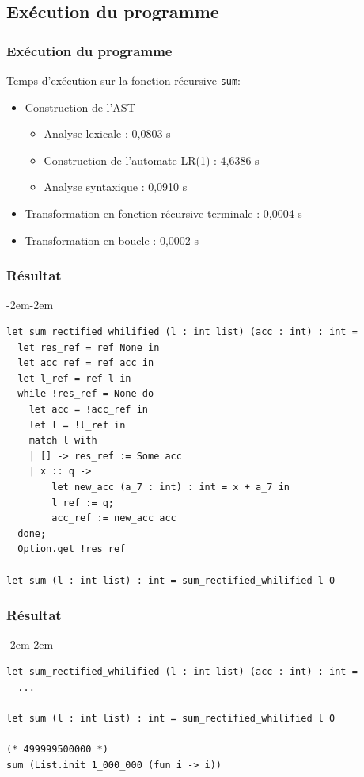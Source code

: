 \subsection{Exécution du programme}
\addtocounter{framenumber}{-1}
\begin{frame}
    \frametitle{Exécution du programme}

    Temps d'exécution sur la fonction récursive \texttt{sum}:
    \begin{itemize}
        \item Construction de l'AST
              \begin{itemize}
                  \item Analyse lexicale : 0,0803 s
                  \item Construction de l'automate LR(1) : 4,6386 s
                  \item Analyse syntaxique : 0,0910 s
              \end{itemize}
        \item Transformation en fonction récursive terminale : 0,0004 s
        \item Transformation en boucle : 0,0002 s
    \end{itemize}
\end{frame}

\begin{frame}[fragile,t]
    \frametitle{Résultat}

    \begin{adjustwidth}{-2em}{-2em}
        \small \begin{verbatim}
let sum_rectified_whilified (l : int list) (acc : int) : int =
  let res_ref = ref None in
  let acc_ref = ref acc in
  let l_ref = ref l in
  while !res_ref = None do
    let acc = !acc_ref in
    let l = !l_ref in
    match l with
    | [] -> res_ref := Some acc
    | x :: q ->
        let new_acc (a_7 : int) : int = x + a_7 in
        l_ref := q;
        acc_ref := new_acc acc
  done;
  Option.get !res_ref

let sum (l : int list) : int = sum_rectified_whilified l 0
        \end{verbatim}

    \end{adjustwidth}
\end{frame}

\addtocounter{framenumber}{-1}
\begin{frame}[fragile,t]
    \frametitle{Résultat}

    \begin{adjustwidth}{-2em}{-2em}
        \small \begin{verbatim}
let sum_rectified_whilified (l : int list) (acc : int) : int =
  ...

let sum (l : int list) : int = sum_rectified_whilified l 0

(* 499999500000 *)
sum (List.init 1_000_000 (fun i -> i))
        \end{verbatim}

    \end{adjustwidth}
\end{frame}

